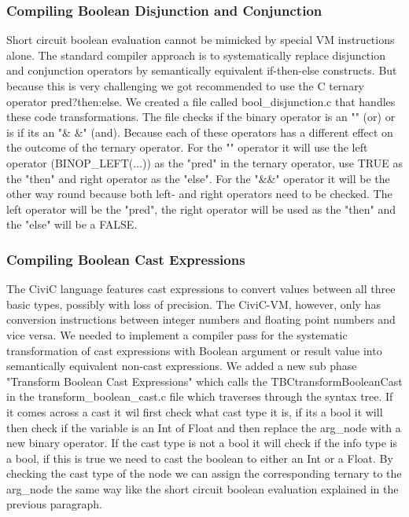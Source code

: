 \documentclass[hidelinks]{uva-inf-article}
\begin{document}
\subsubsection{Compiling Boolean Disjunction and Conjunction}
Short circuit boolean evaluation cannot be mimicked by special VM instructions alone. The standard 
compiler approach is to systematically replace disjunction and conjunction operators by semantically 
equivalent if-then-else constructs. But because this is very challenging we got recommended to use the
C ternary operator pred?then:else. We created a file called bool\_disjunction.c that handles these 
code transformations. The file checks if the binary operator is an "\textbar \textbar" (or) or is if its an "\& \&" (and).
Because each of these operators has a different effect on the outcome of the ternary operator. For 
the "\textbar \textbar" operator it will use the left operator (BINOP\_LEFT(...)) as the "pred" in the ternary operator,
use TRUE as the "then" and right operator as the "else". For the "\&\&" operator it will be the other way 
round because both left- and right operators need to be checked. The left operator will be the "pred",
the right operator will be used as the "then" and the "else" will be a FALSE.

\subsubsection{Compiling Boolean Cast Expressions}
The CiviC language features cast expressions to convert values between all three basic types, possibly 
with loss of precision. The CiviC-VM, however, only has conversion instructions between integer numbers 
and floating point numbers and vice versa. We needed to implement a compiler pass for the systematic 
transformation of cast expressions with Boolean argument or result value into semantically equivalent 
non-cast expressions. We added a new sub phase "Transform Boolean Cast Expressions" which calls the 
TBCtransformBooleanCast in the transform\_boolean\_cast.c file which traverses through the syntax tree.
If it comes across a cast it wil first check what cast type it is, if its a bool it will then check if the
variable is an Int of Float and then replace the arg\_node with a new binary operator. If the cast type
is not a bool it will check if the info type is a bool, if this is true we need to cast the boolean to 
either an Int or a Float. By checking the cast type of the node we can assign the corresponding ternary
to the arg\_node the same way like the short circuit boolean evaluation explained in the previous paragraph.
\end{document}
